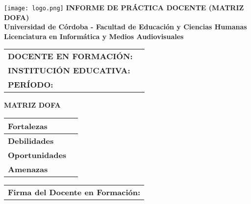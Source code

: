 \documentclass[a4paper,12pt]{article}
\begin{document}
\begin{center}
    \vspace*{1cm}
    \texttt{[image: logo.png]} %
    \vspace{0.5cm}
    \textbf{\Large INFORME DE PRÁCTICA DOCENTE (MATRIZ DOFA)} \\
    \vspace{0.5cm}
    \textbf{Universidad de Córdoba - Facultad de Educación y Ciencias Humanas} \\
    \textbf{Licenciatura en Informática y Medios Audiovisuales}
\end{center}

\vspace{0.5cm}
\begin{tabularx}{\textwidth}{@{}p{5cm}X@{}}
    \toprule
    \textbf{DOCENTE EN FORMACIÓN:} & \hrulefill \\
    \textbf{INSTITUCIÓN EDUCATIVA:} & \hrulefill \\
    \textbf{PERÍODO:} & \hrulefill \\
    \bottomrule
\end{tabularx}

\vspace{0.5cm}
\noindent
\textbf{MATRIZ DOFA}
\begin{table}[h]
    \centering
    \scriptsize
    \begin{tabularx}{\textwidth}{|p{4cm}|X|}
        \hline
        \textbf{Fortalezas} & \vspace{2cm} \\ \hline
        \textbf{Debilidades} & \vspace{2cm} \\ \hline
        \textbf{Oportunidades} & \vspace{2cm} \\ \hline
        \textbf{Amenazas} & \vspace{2cm} \\ \hline
    \end{tabularx}
\end{table}

\vspace{0.5cm}
\begin{center}
    \begin{tabular}{p{7cm}}
        \hline
        \textbf{Firma del Docente en Formación:} \hrulefill \\
    \end{tabular}
\end{center}
\end{document}
